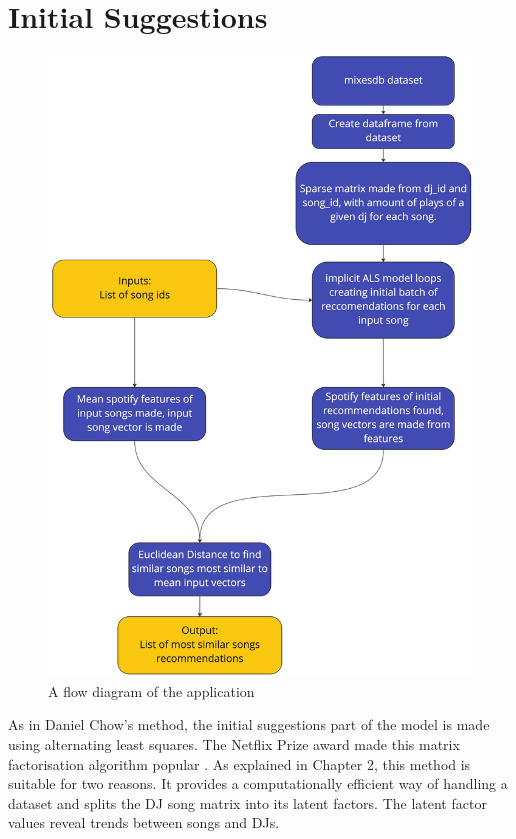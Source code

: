 \section{Initial Suggestions}
\begin{figure}[H]{\noindent\ignorespaces}
	\includegraphics[scale=0.09]{images/application_app_flow}
	\centering
	\caption{A flow diagram of the application} 
\end{figure}
As in Daniel Chow's method, the initial suggestions part of the model is made using alternating least squares. The Netflix Prize award made this matrix factorisation algorithm popular \citep{zhou_large-scale_2008}. As explained in Chapter 2, this method is suitable for two reasons. It provides a computationally efficient way of handling a dataset and splits the DJ song matrix into its latent factors. The latent factor values reveal trends between songs and DJs.

